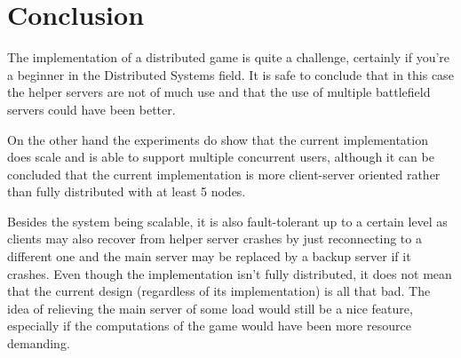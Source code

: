 \section{Conclusion}
The implementation of a distributed game is quite a challenge, certainly if you're a beginner in the Distributed Systems field. 
It is safe to conclude that in this case the helper servers are not of much use and that the use of multiple battlefield servers could have been better.

On the other hand the experiments do show that the current implementation does scale and is able to support multiple concurrent users, although it can be concluded that the current implementation is more client-server oriented rather than fully distributed with at least 5 nodes.

Besides the system being scalable, it is also fault-tolerant up to a certain level as clients may also recover from helper server crashes by just reconnecting to a different one and the main server may be replaced by a backup server if it crashes.
Even though the implementation isn't fully distributed, it does not mean that the current design (regardless of its implementation) is all that bad. 
The idea of relieving the main server of some load would still be a nice feature, especially if the computations of the game would have been more resource demanding. 

